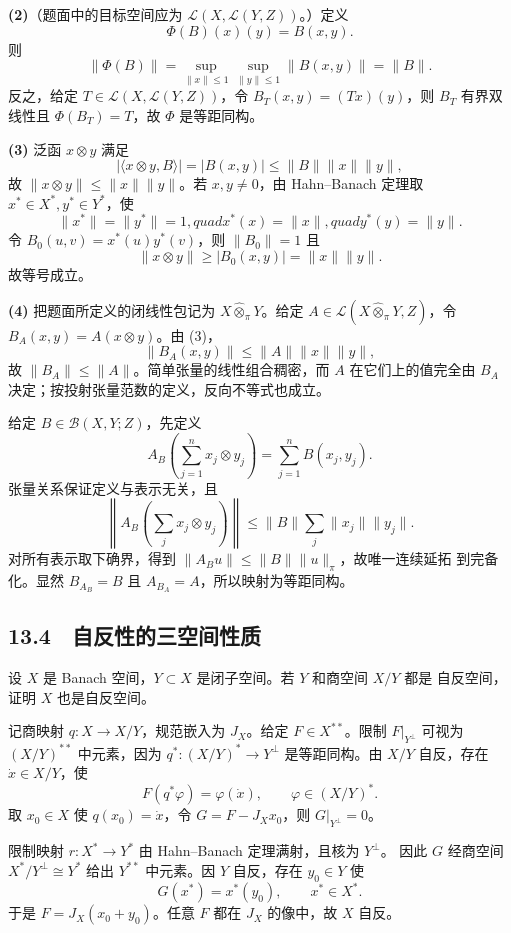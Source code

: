 \textbf{(2)}（题面中的目标空间应为 $\mathcal L(X,\mathcal L(Y,Z))$。）定义
\[
 \Phi(B)(x)(y)=B(x,y).
\]
则
\[
 \|\Phi(B)\|=\sup_{\|x\|\le1}\sup_{\|y\|\le1}\|B(x,y)\|=\|B\|.
\]
反之，给定 $T\in\mathcal L(X,\mathcal L(Y,Z))$，令 $B_T(x,y)=(Tx)(y)$，则
$B_T$ 有界双线性且 $\Phi(B_T)=T$，故 $\Phi$ 是等距同构。

\textbf{(3)} 泛函 $x\otimes y$ 满足
\[
 |\langle x\otimes y,B\rangle|=|B(x,y)|
 \le\|B\|\|x\|\|y\|,
\]
故 $\|x\otimes y\|\le\|x\|\|y\|$。若 $x,y\ne0$，由 Hahn--Banach
定理取 $x^*\in X^*,y^*\in Y^*$，使
\[
 \|x^*\|=\|y^*\|=1,quad x^*(x)=\|x\|,quad y^*(y)=\|y\|.
\]
令 $B_0(u,v)=x^*(u)y^*(v)$，则 $\|B_0\|=1$ 且
\[
 \|x\otimes y\|\ge|B_0(x,y)|=\|x\|\|y\|.
\]
故等号成立。

\textbf{(4)} 把题面所定义的闭线性包记为 $X\widehat\otimes_\pi Y$。给定
$A\in\mathcal L(X\widehat\otimes_\pi Y,Z)$，令 $B_A(x,y)=A(x\otimes y)$。由 (3)，
\[
 \|B_A(x,y)\|\le\|A\|\|x\|\|y\|,
\]
故 $\|B_A\|\le\|A\|$。简单张量的线性组合稠密，而 $A$ 在它们上的值完全由
$B_A$ 决定；按投射张量范数的定义，反向不等式也成立。

给定 $B\in\mathcal B(X,Y;Z)$，先定义
\[
 A_B\left(\sum_{j=1}^nx_j\otimes y_j\right)=\sum_{j=1}^nB(x_j,y_j).
\]
张量关系保证定义与表示无关，且
\[
 \left\|A_B\left(\sum_jx_j\otimes y_j\right)\right\|
 \le\|B\|\sum_j\|x_j\|\|y_j\|.
\]
对所有表示取下确界，得到 $\|A_Bu\|\le\|B\|\|u\|_\pi$，故唯一连续延拓
到完备化。显然 $B_{A_B}=B$ 且 $A_{B_A}=A$，所以映射为等距同构。

\subsection*{13.4　自反性的三空间性质}

\begin{problem}
设 $X$ 是 Banach 空间，$Y\subset X$ 是闭子空间。若 $Y$ 和商空间 $X/Y$ 都是
自反空间，证明 $X$ 也是自反空间。
\end{problem}

记商映射 $q:X\to X/Y$，规范嵌入为 $J_X$。给定 $F\in X^{**}$。限制
$F|_{Y^\perp}$ 可视为 $(X/Y)^{**}$ 中元素，因为
$q^*:(X/Y)^*\to Y^\perp$ 是等距同构。由 $X/Y$ 自反，存在
$\dot x\in X/Y$，使
\[
 F(q^*\varphi)=\varphi(\dot x),\qquad \varphi\in(X/Y)^*.
\]
取 $x_0\in X$ 使 $q(x_0)=\dot x$，令 $G=F-J_Xx_0$，则
$G|_{Y^\perp}=0$。

限制映射 $r:X^*\to Y^*$ 由 Hahn--Banach 定理满射，且核为 $Y^\perp$。
因此 $G$ 经商空间 $X^*/Y^\perp\cong Y^*$ 给出 $Y^{**}$ 中元素。因 $Y$
自反，存在 $y_0\in Y$ 使
\[
 G(x^*)=x^*(y_0),\qquad x^*\in X^*.
\]
于是 $F=J_X(x_0+y_0)$。任意 $F$ 都在 $J_X$ 的像中，故 $X$ 自反。

